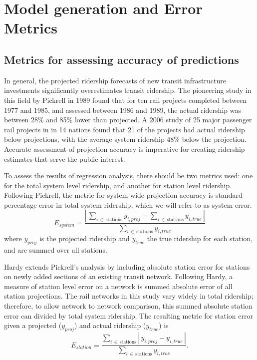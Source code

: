 \documentclass[11pt]{article}
\begin{document}
\section{Model generation and Error Metrics}

\subsection{Metrics for assessing accuracy of predictions}

In general, the projected ridership forecasts of new transit infrastructure investments significantly overestimates transit ridership. The pioneering study in this field by Pickrell in 1989 \cite{Pickrell1989} found that for ten rail projects completed between 1977 and 1985, and assessed between 1986 and 1989, the actual ridership was between 28\% and 85\% lower than projected. A 2006 study \cite{Flyvbjerg2006} of 25 major passenger rail projects in  in 14 nations found that 21 of the projects had actual ridership below projections, with the average system ridership 48\% below the projection. Accurate assessment of projection accuracy is imperative for creating ridership estimates that serve the public interest.

To assess the results of regression analysis, there should be two metrics used: one for the total system level ridership, and another for station level ridership. Following Pickrell, the metric for system-wide projection accuracy is standard percentage error in total system ridership, which we will refer to as system error. 
$$E_{system} = \dfrac{\left|\,\sum\limits_{i\,\in\,\text{stations}} y_{i, proj} - \sum\limits_{i\,\in\,\text{stations}} y_{i, true}\,\right|}{\sum\limits_{i\,\in\,\text{stations}} y_{i, true}}$$
where $y_{proj}$ is the projected ridership and $y_{true}$ the true ridership for each station, and are summed over all stations.

Hardy \cite{Hardy2010} extends Pickrell's analysis by including absolute station error for stations on newly added sections of an existing transit network. Following Hardy, a measure of station level error on a network is summed absolute error of all station projections. The rail networks in this study vary widely in total ridership; therefore, to allow network to network comparison, this summed absolute station error can divided by total system ridership. The resulting metric for station error given a projected ($y_{proj}$) and actual ridership ($y_{true}$) is 
$$E_{station} = \dfrac{\sum\limits_{i\,\in\,\text{stations}}\left|\,y_{i, proj} - y_{i, true}\,\right|}{\sum\limits_{i\,\in\,\text{stations}} y_{i, true}}.$$
\end{document}
